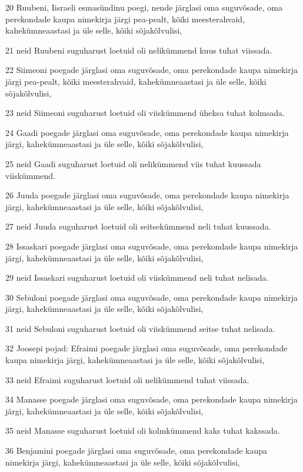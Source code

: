 \par 20 Ruubeni, Iisraeli esmasündinu poegi, nende järglasi oma suguvõsade, oma perekondade kaupa nimekirja järgi pea-pealt, kõiki meesterahvaid, kahekümneaastasi ja üle selle, kõiki sõjakõlvulisi,
\par 21 neid Ruubeni suguharust loetuid oli nelikümmend kuus tuhat viissada.
\par 22 Siimeoni poegade järglasi oma suguvõsade, oma perekondade kaupa nimekirja järgi pea-pealt, kõiki meesterahvaid, kahekümneaastasi ja üle selle, kõiki sõjakõlvulisi,
\par 23 neid Siimeoni suguharust loetuid oli viiskümmend üheksa tuhat kolmsada.
\par 24 Gaadi poegade järglasi oma suguvõsade, oma perekondade kaupa nimekirja järgi, kahekümneaastasi ja üle selle, kõiki sõjakõlvulisi,
\par 25 neid Gaadi suguharust loetuid oli nelikümmend viis tuhat kuussada viiskümmend.
\par 26 Juuda poegade järglasi oma suguvõsade, oma perekondade kaupa nimekirja järgi, kahekümneaastasi ja üle selle, kõiki sõjakõlvulisi,
\par 27 neid Juuda suguharust loetuid oli seitsekümmend neli tuhat kuussada.
\par 28 Issaskari poegade järglasi oma suguvõsade, oma perekondade kaupa nimekirja järgi, kahekümneaastasi ja üle selle, kõiki sõjakõlvulisi,
\par 29 neid Issaskari suguharust loetuid oli viiskümmend neli tuhat nelisada.
\par 30 Sebuloni poegade järglasi oma suguvõsade, oma perekondade kaupa nimekirja järgi, kahekümneaastasi ja üle selle, kõiki sõjakõlvulisi,
\par 31 neid Sebuloni suguharust loetuid oli viiskümmend seitse tuhat nelisada.
\par 32 Joosepi pojad: Efraimi poegade järglasi oma suguvõsade, oma perekondade kaupa nimekirja järgi, kahekümneaastasi ja üle selle, kõiki sõjakõlvulisi,
\par 33 neid Efraimi suguharust loetuid oli nelikümmend tuhat viissada.
\par 34 Manasse poegade järglasi oma suguvõsade, oma perekondade kaupa nimekirja järgi, kahekümneaastasi ja üle selle, kõiki sõjakõlvulisi,
\par 35 neid Manasse suguharust loetuid oli kolmkümmend kaks tuhat kakssada.
\par 36 Benjamini poegade järglasi oma suguvõsade, oma perekondade kaupa nimekirja järgi, kahekümneaastasi ja üle selle, kõiki sõjakõlvulisi,
